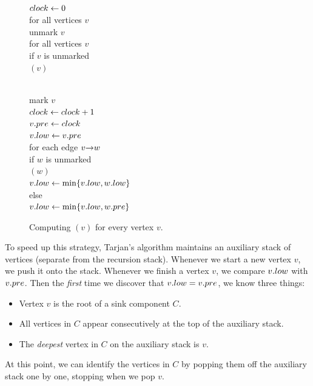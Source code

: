 \begin{figure}[ht]
\centering
\begin{minipage}[c]{0.42\linewidth}
\begin{pseudocode}
\\
$clock \gets 0$\\
for all vertices $v$\\
\Indent unmark $v$\\
\Indent for all vertices $v$\\
\Indent\Indent if $v$ is unmarked\\
\Indent\Indent\Indent {}$(v)$
\end{pseudocode}
\end{minipage}\hfill
\begin{minipage}[c]{0.54\linewidth}
\begin{pseudocode}
\\
mark $v$\\
$clock \gets clock + 1$\\
$v.pre \gets clock$\\
$v.low \gets v.pre$\\
for each edge $v\mathord{\rightarrow}w$\\
\Indent if $w$ is unmarked\\
\Indent\Indent {}$(w)$\\
\Indent\Indent $v.low \gets \min\{v.low, w.low\}$\\
\Indent else\\
\Indent\Indent $v.low \gets \min\{v.low, w.pre\}$
\end{pseudocode}
\end{minipage}
\caption{Computing $(v)$ for every vertex $v$.}
\label{fig:6.18}
\end{figure}

To speed up this strategy, Tarjan’s algorithm maintains an auxiliary stack of vertices (separate from the recursion stack).
Whenever we start a new vertex $v$, we push it onto the stack.
Whenever we finish a vertex $v$, we compare $v.low$ with $v.pre$.
Then the \textit{first} time we discover that $v.low = v.pre$, we know three things:
\begin{itemize}
\item Vertex $v$ is the root of a sink component $C$.
\item All vertices in $C$ appear consecutively at the top of the auxiliary stack.
\item The \textit{deepest} vertex in $C$ on the auxiliary stack is $v$.
\end{itemize}
At this point, we can identify the vertices in $C$ by popping them off the auxiliary stack one by one, stopping when we pop $v$.

